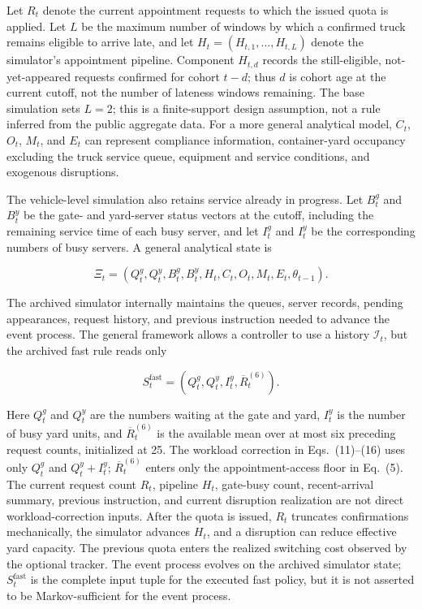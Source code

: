 \documentclass[preprint,12pt,authoryear,a4paper]{elsarticle}
\begin{document}
Let \(R_t\) denote the current appointment requests to which the issued quota is applied. Let \(L\) be the maximum number of windows by which a confirmed truck remains eligible to arrive late, and let \(H_t=(H_{t,1},\ldots,H_{t,L})\) denote the simulator's appointment pipeline. Component \(H_{t,d}\) records the still-eligible, not-yet-appeared requests confirmed for cohort \(t-d\); thus \(d\) is cohort age at the current cutoff, not the number of lateness windows remaining. The base simulation sets \(L=2\); this is a finite-support design assumption, not a rule inferred from the public aggregate data. For a more general analytical model, \(C_t\), \(O_t\), \(M_t\), and \(E_t\) can represent compliance information, container-yard occupancy excluding the truck service queue, equipment and service conditions, and exogenous disruptions.

The vehicle-level simulation also retains service already in progress. Let \(B_t^g\) and \(B_t^y\) be the gate- and yard-server status vectors at the cutoff, including the remaining service time of each busy server, and let \(I_t^g\) and \(I_t^y\) be the corresponding numbers of busy servers. A general analytical state is

\[
\Xi_t=(Q_t^g,Q_t^y,B_t^g,B_t^y,H_t,C_t,O_t,M_t,E_t,\theta_{t-1}).
\]

The archived simulator internally maintains the queues, server records, pending appearances, request history, and previous instruction needed to advance the event process. The general framework allows a controller to use a history \(\mathcal I_t\), but the archived fast rule reads only

\[
S_t^{\mathrm{fast}}=
(Q_t^g,Q_t^y,I_t^y,\overline R_t^{(6)}).
\]

Here \(Q_t^g\) and \(Q_t^y\) are the numbers waiting at the gate and yard, \(I_t^y\) is the number of busy yard units, and \(\overline R_t^{(6)}\) is the available mean over at most six preceding request counts, initialized at 25. The workload correction in Eqs.~(11)--(16) uses only \(Q_t^g\) and \(Q_t^y+I_t^y\); \(\overline R_t^{(6)}\) enters only the appointment-access floor in Eq.~(5). The current request count \(R_t\), pipeline \(H_t\), gate-busy count, recent-arrival summary, previous instruction, and current disruption realization are not direct workload-correction inputs. After the quota is issued, \(R_t\) truncates confirmations mechanically, the simulator advances \(H_t\), and a disruption can reduce effective yard capacity. The previous quota enters the realized switching cost observed by the optional tracker. The event process evolves on the archived simulator state; \(S_t^{\mathrm{fast}}\) is the complete input tuple for the executed fast policy, but it is not asserted to be Markov-sufficient for the event process.
\end{document}
